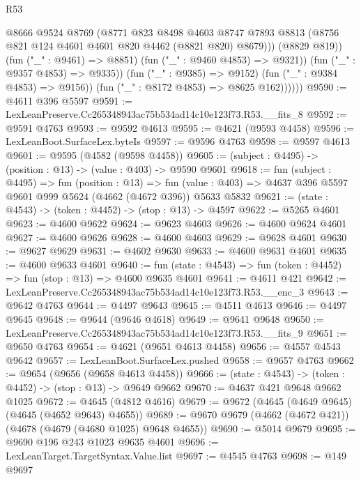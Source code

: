 \begin{lexlean}{R53}
\begin{coremodule}
                        @8666
                        @9524
                        @8769
                        (@8771
                          @823
                          @8498
                          @4603
                          @8747
                          @7893
                          @8813
                          (@8756 @821 @124 @4601 @4601 @820 @4462 (@8821 @820) @8679)))
                      (@8829 @819))
                    (fun ("_" : @9461) => @8851)
                    (fun ("_" : @9460 @4853) => @9321))
                  (fun ("_" : @9357 @4853) => @9335))
                (fun ("_" : @9385) => @9152)
                (fun ("_" : @9384 @4853) => @9156))
              (fun ("_" : @8172 @4853) => @8625 @162))))))
@9590 := @4611 @396 @5597
@9591 := LexLeanPreserve.Cc265348943ac75b534ad14c10e123f73.R53.__fits_8
@9592 := @9591 @4763
@9593 := @9592 @4613
@9595 := @4621 (@9593 @4458)
@9596 := LexLeanBoot.SurfaceLex.byteIs
@9597 := @9596 @4763
@9598 := @9597 @4613
@9601 := @9595 (@4582 (@9598 @4458))
@9605 := (subject : @4495) -> (position : @13) -> (value : @403) -> @9590 @9601
@9618 := fun (subject : @4495) =>
  fun (position : @13) =>
  fun (value : @403) => @4637 @396 @5597 @9601 @999 @5624 (@4662 (@4672 @396)) @5633 @5832
@9621 := (state : @4543) -> (token : @4452) -> (stop : @13) -> @4597
@9622 := @5265 @4601
@9623 := @4600 @9622
@9624 := @9623 @4603
@9626 := @4600 @9624 @4601
@9627 := @4600 @9626
@9628 := @4600 @4603
@9629 := @9628 @4601
@9630 := @9627 @9629
@9631 := @4602 @9630
@9633 := @4600 @9631 @4601
@9635 := @4600 @9633 @4601
@9640 := fun (state : @4543) => fun (token : @4452) => fun (stop : @13) => @4600 @9635 @4601
@9641 := @4611 @421
@9642 := LexLeanPreserve.Cc265348943ac75b534ad14c10e123f73.R53.__enc_3
@9643 := @9642 @4763
@9644 := @4497 @9643
@9645 := @4511 @4613
@9646 := @4497 @9645
@9648 := @9644 (@9646 @4618)
@9649 := @9641 @9648
@9650 := LexLeanPreserve.Cc265348943ac75b534ad14c10e123f73.R53.__fits_9
@9651 := @9650 @4763
@9654 := @4621 (@9651 @4613 @4458)
@9656 := @4557 @4543 @9642
@9657 := LexLeanBoot.SurfaceLex.pushed
@9658 := @9657 @4763
@9662 := @9654 (@9656 (@9658 @4613 @4458))
@9666 := (state : @4543) -> (token : @4452) -> (stop : @13) -> @9649 @9662
@9670 := @4637 @421 @9648 @9662 @1025
@9672 := @4645 (@4812 @4616)
@9679 := @9672 (@4645 (@4649 @9645) (@4645 (@4652 @9643) @4655))
@9689 := @9670 @9679 (@4662 (@4672 @421)) (@4678 (@4679 (@4680 @1025) @9648 @4655))
@9690 := @5014 @9679
@9695 := @9690 @196 @243 @1023 @9635 @4601
@9696 := LexLeanTarget.TargetSyntax.Value.list
@9697 := @4545 @4763
@9698 := @149 @9697

\end{coremodule}
\end{lexlean}
